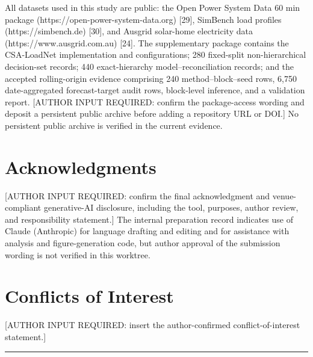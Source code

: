 \documentclass[electronics,article,submit,moreauthors]{Definitions/mdpi}
\begin{document}
All datasets used in this study are public: the Open Power System Data 60 min package (https://open-power-system-data.org) {[}29{]}, SimBench load profiles (https://simbench.de) {[}30{]}, and Ausgrid solar-home electricity data (https://www.ausgrid.com.au) {[}24{]}. The supplementary package contains the CSA-LoadNet implementation and configurations; 280 fixed-split non-hierarchical decision-set records; 440 exact-hierarchy model--reconciliation records; and the accepted rolling-origin evidence comprising 240 method--block--seed rows, 6,750 date-aggregated forecast-target audit rows, block-level inference, and a validation report. {[}AUTHOR INPUT REQUIRED: confirm the package-access wording and deposit a persistent public archive before adding a repository URL or DOI.{]} No persistent public archive is verified in the current evidence.

\section*{Acknowledgments}

{[}AUTHOR INPUT REQUIRED: confirm the final acknowledgment and venue-compliant generative-AI disclosure, including the tool, purposes, author review, and responsibility statement.{]} The internal preparation record indicates use of Claude (Anthropic) for language drafting and editing and for assistance with analysis and figure-generation code, but author approval of the submission wording is not verified in this worktree.

\section*{Conflicts of Interest}

{[}AUTHOR INPUT REQUIRED: insert the author-confirmed conflict-of-interest statement.{]}

\begin{center}\rule{0.5\linewidth}{0.5pt}\end{center}
\end{document}
